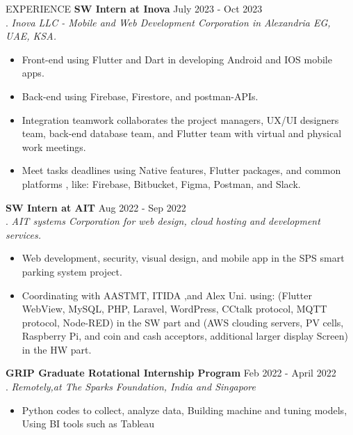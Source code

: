 \documentclass{resume} %
\begin{document}


 \begin{rSection}{EXPERIENCE}
 \textbf{SW Intern at Inova} \hfill  July 2023 - Oct 2023\\
  .	    \hfill \textit{Inova LLC - Mobile and Web Development Corporation in Alexandria EG, UAE, KSA.}
  \begin{itemize}
     \itemsep -3pt {} 
      \item Front-end using Flutter and Dart in developing Android and IOS mobile apps.
      \item Back-end using Firebase, Firestore, and postman-APIs.
      \item Integration teamwork collaborates the project managers, UX/UI designers team, back-end database team, and Flutter team with virtual and physical work meetings.
      \item  Meet tasks deadlines using Native features, Flutter packages, and common platforms , like: Firebase, Bitbucket, Figma, Postman, and Slack.
 \end{itemize}

 \textbf{SW Intern at AIT} \hfill  Aug 2022 - Sep 2022\\
  .	 \hfill \textit{AIT systems Corporation for web design, cloud hosting and development services.}
  \begin{itemize}
     \itemsep -3pt {} 
      \item Web development, security, visual design, and mobile app in the SPS smart parking system project.
      \item Coordinating with AASTMT, ITIDA ,and Alex Uni. using: (Flutter WebView, MySQL, PHP, Laravel, WordPress, CCtalk protocol, MQTT protocol, Node-RED) in the SW part and (AWS clouding servers, PV cells, Raspberry Pi, and coin and cash acceptors, additional larger display Screen) in the HW part.
 \end{itemize}


 \textbf{GRIP Graduate Rotational Internship Program} \hfill  Feb 2022 - April 2022\\
  .	 \hfill \textit{Remotely,at The Sparks Foundation, India and Singapore}
  \begin{itemize}
     \itemsep -3pt {} 
      \item Python codes to collect, analyze data, Building machine and tuning models, Using BI tools such as Tableau
 \end{itemize}
 

\end{rSection}
\end{document}
